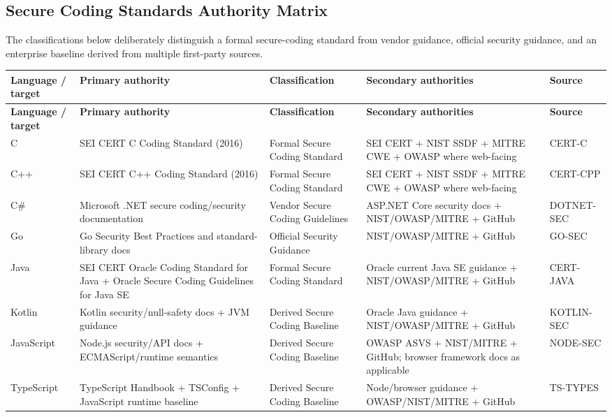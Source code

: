 \documentclass[10pt,letterpaper]{article}
\begin{document}
\begin{landscape}
\section{Secure Coding Standards Authority Matrix}
The classifications below deliberately distinguish a formal secure-coding standard from vendor guidance, official security guidance, and an enterprise baseline derived from multiple first-party sources.

\scriptsize
\setlength{\tabcolsep}{3pt}
\begin{longtable}{@{}P{0.8in}P{2.05in}P{1.45in}P{3.25in}P{0.7in}@{}}
\toprule
\textbf{Language / target} & \textbf{Primary authority} & \textbf{Classification} & \textbf{Secondary authorities} & \textbf{Source}\\
\midrule
\endfirsthead
\toprule
\textbf{Language / target} & \textbf{Primary authority} & \textbf{Classification} & \textbf{Secondary authorities} & \textbf{Source}\\
\midrule
\endhead
C & SEI CERT C Coding Standard (2016) & Formal Secure Coding Standard & SEI CERT + NIST SSDF + MITRE CWE + OWASP where web-facing & CERT-C\\
C++ & SEI CERT C++ Coding Standard (2016) & Formal Secure Coding Standard & SEI CERT + NIST SSDF + MITRE CWE + OWASP where web-facing & CERT-CPP\\
C\# & Microsoft .NET secure coding/security documentation & Vendor Secure Coding Guidelines & ASP.NET Core security docs + NIST/OWASP/MITRE + GitHub & DOTNET-SEC\\
Go & Go Security Best Practices and standard-library docs & Official Security Guidance & NIST/OWASP/MITRE + GitHub & GO-SEC\\
Java & SEI CERT Oracle Coding Standard for Java + Oracle Secure Coding Guidelines for Java SE & Formal Secure Coding Standard & Oracle current Java SE guidance + NIST/OWASP/MITRE + GitHub & CERT-JAVA\\
Kotlin & Kotlin security/null-safety docs + JVM guidance & Derived Secure Coding Baseline & Oracle Java guidance + NIST/OWASP/MITRE + GitHub & KOTLIN-SEC\\
JavaScript & Node.js security/API docs + ECMAScript/runtime semantics & Derived Secure Coding Baseline & OWASP ASVS + NIST/MITRE + GitHub; browser framework docs as applicable & NODE-SEC\\
TypeScript & TypeScript Handbook + TSConfig + JavaScript runtime baseline & Derived Secure Coding Baseline & Node/browser guidance + OWASP/NIST/MITRE + GitHub & TS-TYPES\\

\end{longtable}
\end{landscape}
\end{document}
